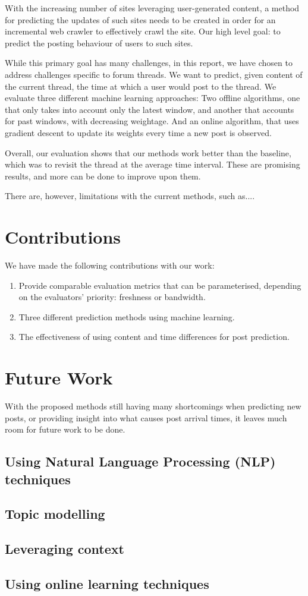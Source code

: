 With the increasing number of sites leveraging user-generated content, a method 
for predicting the updates of such sites needs to be created in order for an 
incremental web crawler to effectively crawl the site. Our high level goal: to 
predict the posting behaviour of users to such sites.

While this primary goal has many challenges, in this report, we have chosen to 
address challenges specific to forum threads. We want to predict, given content 
of the current thread, the time at which a user would post to the thread. We 
evaluate three different machine learning approaches: Two offline algorithms, 
one that only takes into account only the latest window, and another that 
accounts for past windows, with decreasing weightage. And an online algorithm, 
that uses gradient descent to update its weights every time a new post is 
observed.

Overall, our evaluation shows that our methods work better than the baseline, 
which was to revisit the thread at the average time interval. These are 
promising results, and more can be done to improve upon them. 

There are, however, limitations with the current methods, such as....


\section{Contributions}
We have made the following contributions with our work:
\begin{enumerate}
\item Provide comparable evaluation metrics that can be parameterised, depending 
on the evaluators' priority: freshness or bandwidth.

\item Three different prediction methods using machine learning.
\item The effectiveness of using content and time differences for post 
prediction.
\end{enumerate}

\section{Future Work}

With the proposed methods still having many shortcomings when predicting new 
posts, or providing insight into what causes post arrival times, it leaves much 
room for future work to be done.

\subsection{Using Natural Language Processing (NLP) techniques}
\cite{Wang}

\subsection{Topic modelling}
\cite{Gonzalez2005,Hsu2006}

\subsection{Leveraging context}


\subsection{Using online learning techniques}



